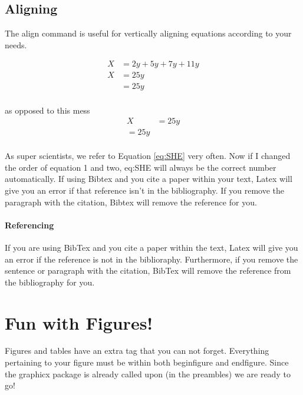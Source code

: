\documentclass[12pt]{article} %
\begin{document}
\subsection*{Aligning}
The align command is useful for vertically aligning equations according to your needs.

\begin{align*}
X&=2y+5y+7y+11y\nonumber\\  %
X&=25y\\  %
&=25y\\  %
\end{align*}

as opposed to this mess\\

\begin{align*}
X&=25y\\
=25y\\
\end{align*}


As super scientists, we refer to Equation \ref{eq:SHE} very often.  Now if I changed the order of equation 1 and two, eq:SHE will always be the correct number automatically.
If using Bibtex and you cite a paper within your text, Latex will give you an error if that reference isn’t in the bibliography.  If you remove the paragraph with the citation, Bibtex will remove the reference for you.

\paragraph{Referencing}
If you are using BibTex and you cite a paper within the text, Latex will give you an error if the reference is not in the biblioraphy.  Furthermore, if you remove the sentence or paragraph with the citation, BibTex will remove the reference from the bibliography for you.


\section{Fun with Figures!}
Figures and tables have an extra tag that you can not forget.  Everything pertaining to your figure must be within both begin{figure} and end{figure}.  Since the graphicx package is already called upon (in the preambles) we are ready to go!
\end{document}
